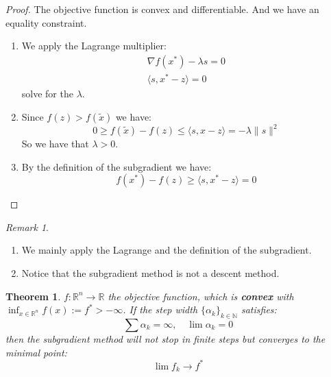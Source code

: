 \documentclass[a4paper,11pt,fleqn, draft]{book}
\newtheorem{theorem}{Theorem}[section]
\theoremstyle{definition}
\theoremstyle{remark}
\newtheorem*{remark}{Remark}
\begin{document}
\begin{proof}
	The objective function is convex and differentiable. And we have an equality constraint.
	\begin{enumerate}
		\item We apply the Lagrange multiplier:
			\begin{align*}
				\nabla f(x^*) - \lambda s = 0\\
				\langle s, x^* - z \rangle = 0
			\end{align*}
			solve for the $\lambda$.
		\item Since $f(z) > f(\tilde{x})$ we have:
			\begin{equation*}
				0 \geq f(\tilde{x}) - f(z) \leq \langle s, x - z \rangle = - \lambda \|s\|^2
			\end{equation*}
			So we have that $\lambda > 0$.
		\item By the definition of the subgradient we have:
			\begin{equation*}
				f(x^*) - f(z) \geq \langle s, x^* - z \rangle = 0
			\end{equation*}
	\end{enumerate}
\end{proof}

\begin{remark}\quad
	\begin{enumerate}
		\item We mainly apply the Lagrange and the definition of the subgradient.
		\item Notice that the subgradient method is not a descent method.
	\end{enumerate}
\end{remark}


\begin{theorem}
	$f : \mathbb{R}^n \longrightarrow \mathbb{R}$ the objective function, which is \textbf{convex} with $\inf_{x \in \mathbb{R}^n} f(x) := f^* > - \infty$. If the step width $\{\alpha_k \}_{k \in \mathbb{N}}$ satisfies:
	\begin{equation*}
		\sum \alpha_k = \infty, \quad \lim \alpha_k = 0
	\end{equation*}
	then the subgradient method will not stop in finite steps but converges to the minimal point:
	\begin{equation*}
		\lim f_k \longrightarrow f^*
	\end{equation*}
\end{theorem}
\end{document}
